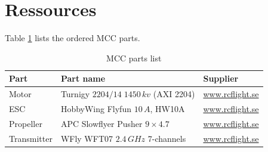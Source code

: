 \section{Ressources}
%
Table \ref{tab:mcc_parts_list} lists the ordered \ac{MCC} parts.
\begin{table}[bht]
\centering
\caption{MCC parts list}
\begin{tabular}{l l l}
\hline
\textbf{Part} &  \textbf{Part name} & \textbf{Supplier}\\ 
\hline
Motor & Turnigy $2204/14\;1450\,kv$ (AXI 2204) & \url{www.rcflight.se} \\
ESC & HobbyWing Flyfun $10\,A$, HW10A & \url{www.rcflight.se}\\
Propeller & APC Slowflyer Pusher $9 \times 4.7$ & \url{www.rcflight.se}\\
Transmitter & WFly WFT07 $2.4\,GHz$ 7-channels & \url{www.rcflight.se}\\
\hline
\end{tabular}
\label{tab:mcc_parts_list}
\end{table}
%